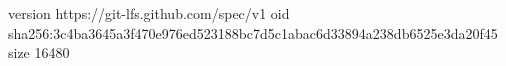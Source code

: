version https://git-lfs.github.com/spec/v1
oid sha256:3c4ba3645a3f470e976ed523188bc7d5c1abac6d33894a238db6525e3da20f45
size 16480
